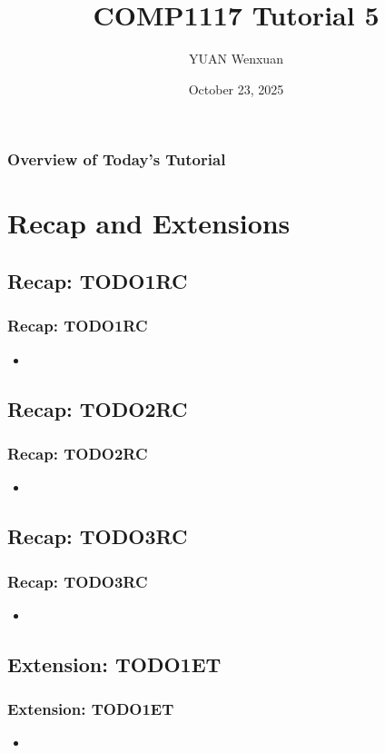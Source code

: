 \documentclass{beamer}
\title{COMP1117 Tutorial 5}
\author{YUAN Wenxuan}
\date{October 23, 2025}
\begin{document}
\frame{\titlepage}

\begin{frame}
    \frametitle{Overview of Today's Tutorial}
    \tableofcontents
\end{frame}

\section{Recap and Extensions}
\subsection{Recap: TODO1RC}
\begin{frame}
    \frametitle{Recap: TODO1RC}
    \begin{itemize}
        \item
    \end{itemize}
\end{frame}
\subsection{Recap: TODO2RC}
\begin{frame}
    \frametitle{Recap: TODO2RC}
    \begin{itemize}
        \item
    \end{itemize}
\end{frame}
\subsection{Recap: TODO3RC}
\begin{frame}
    \frametitle{Recap: TODO3RC}
    \begin{itemize}
        \item
    \end{itemize}
\end{frame}

\subsection{Extension: TODO1ET}
\begin{frame}
    \frametitle{Extension: TODO1ET}
    \begin{itemize}
        \item
    \end{itemize}
\end{frame}
\end{document}
